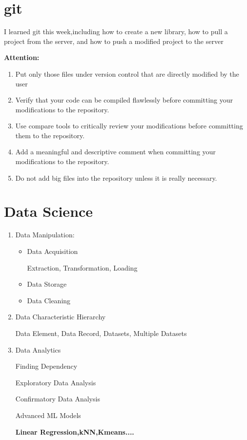 \section{git}\label{sec-git}
I learned git this week,including how to create a new library, how to pull a project from the server, and how to push a modified project to the server

\textbf{Attention:}
\begin{enumerate}
  \item Put only those files under version control that are directly modified by the user
  \item Verify that your code can be compiled flawlessly before committing your modifications to the repository.
  \item Use compare tools to critically review your modifications before committing them to the repository.
  \item Add a meaningful and descriptive comment when committing your modifications to the repository.
  \item Do not add big files into the repository unless it is really necessary.
\end{enumerate}


\section{Data Science} \label{sec-Data_Science}
\begin{enumerate}
  \item Data Manipulation:
    \begin{itemize}
      \item Data Acquisition\par
        Extraction,
        Transformation,
        Loading
      \item Data Storage
      \item Data Cleaning
    \end{itemize}
  \item Data Characteristic Hierarchy\par
    Data Element,
    Data Record,
    Datasets,
    Multiple Datasets  
  \item Data Analytics\par
    Finding Dependency\par
    Exploratory Data Analysis\par
    Confirmatory Data Analysis\par
    Advanced ML Models\par
    \hspace{2em}\textbf{Linear Regression,kNN,Kmeans....}
\end{enumerate}



